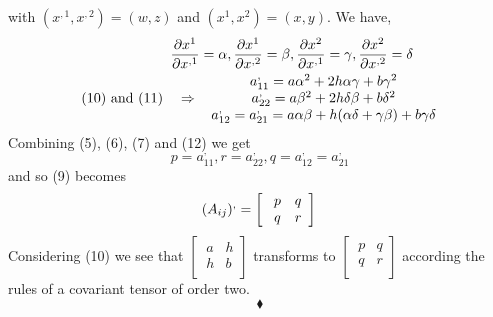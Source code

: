 with $(x^{,1},x^{,2}) = (w, z)$ and $(x^{1},x^{2}) = (x, y)$. We have,
\begin{align}
\ \pdv{x^1}{x^{,1}} &= \alpha, \pdv{x^1}{x^{,2}} = \beta,\pdv{x^2}{x^{,1}} = \gamma,\pdv{x^2}{x^{,2}} = \delta\\
\text{ (10) and (11)}\quad \Rightarrow\ &\begin{array}{c}
  \ a^{,}_{11} = a \alpha^2 + 2 h \alpha \gamma + b \gamma^2 \\
  \ a^{,}_{22} = a \beta^2 + 2 h \delta \beta + b \delta^2 \\
  \ a^{,}_{12} = a^{,}_{21} =a \alpha \beta + h( \alpha \delta + \gamma \beta) + b \gamma \delta \\
  \end{array}
\end{align}
Combining (5), (6), (7) and (12) we get $$ p = a^{,}_{11}, r = a^{,}_{22}, q =  a^{,}_{12} = a^{,}_{21}$$ and so (9) becomes $$  (A_{ij})^{,} = \left[ { \begin{array}{cc}
  \ p &  q\\
  \ q  & r\\
  \end{array}} \right] \\$$
Considering (10) we see that $\left[ { \begin{array}{cc}
  \ a &  h\\
  \ h   &b\\
  \end{array}} \right] $ transforms to $\left[ { \begin{array}{cc}
  \ p &  q\\
  \ q  & r\\
  \end{array}} \right]$ according the rules of a covariant tensor of order two.
$$\blacklozenge$$
\pagebreak[4]

